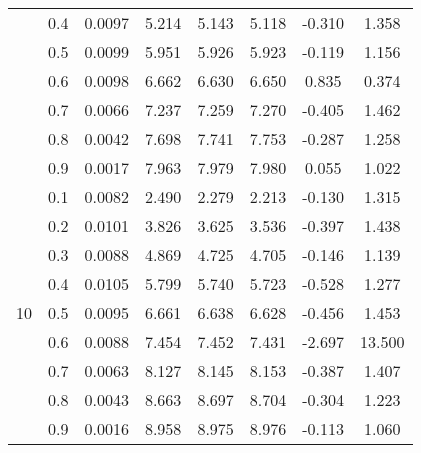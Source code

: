 \documentclass[11pt,a4paper]{report}
\begin{document}
\begin{longtable}{ | c | c || c | c | c | c | c | c | }
 & 0.4 & 0.0097 & 5.214 & 5.143 & 5.118 & -0.310 & 1.358 \\
 & 0.5 & 0.0099 & 5.951 & 5.926 & 5.923 & -0.119 & 1.156 \\
 & 0.6 & 0.0098 & 6.662 & 6.630 & 6.650 & 0.835 & 0.374 \\
 & 0.7 & 0.0066 & 7.237 & 7.259 & 7.270 & -0.405 & 1.462 \\
 & 0.8 & 0.0042 & 7.698 & 7.741 & 7.753 & -0.287 & 1.258 \\
 & 0.9 & 0.0017 & 7.963 & 7.979 & 7.980 & 0.055 & 1.022 \\
 \hline
\multirow{9}{*}{10} & 0.1 & 0.0082 & 2.490 & 2.279 & 2.213 & -0.130 & 1.315 \\
 & 0.2 & 0.0101 & 3.826 & 3.625 & 3.536 & -0.397 & 1.438 \\
 & 0.3 & 0.0088 & 4.869 & 4.725 & 4.705 & -0.146 & 1.139 \\
 & 0.4 & 0.0105 & 5.799 & 5.740 & 5.723 & -0.528 & 1.277 \\
 & 0.5 & 0.0095 & 6.661 & 6.638 & 6.628 & -0.456 & 1.453 \\
 & 0.6 & 0.0088 & 7.454 & 7.452 & 7.431 & -2.697 & 13.500 \\
 & 0.7 & 0.0063 & 8.127 & 8.145 & 8.153 & -0.387 & 1.407 \\
 & 0.8 & 0.0043 & 8.663 & 8.697 & 8.704 & -0.304 & 1.223 \\
 & 0.9 & 0.0016 & 8.958 & 8.975 & 8.976 & -0.113 & 1.060 \\
 \hline
\hline
\end{longtable}
\end{document}
